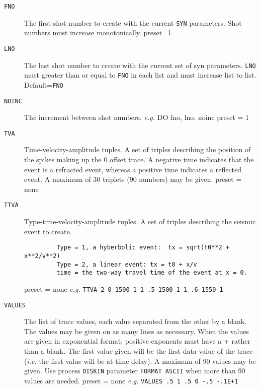 \begin{description}
    \item[\texttt{FNO}] The first \gls{shot} number to create with the current \texttt{SYN} parameters.
         Shot numbers must increase monotonically.
         \Gls{preset}=1

\item[\texttt{LNO}] The last \gls{shot} number to create with the current set of syn
         parameters.  \texttt{LNO} must greater than or equal to \texttt{FNO} in each list
         and must increase list to list.
         Default=\texttt{FNO}

\item[\texttt{NOINC}] The increment between \gls{shot} numbers.  \textit{e.g.} DO fno, lno, noinc
         \Gls{preset} = 1

\item[\texttt{TVA}] Time-velocity-amplitude tuples.  A set of triples describing
         the position of the spikes making up the 0 offset trace.  A
         negative time indicates that the event is a refracted event,
         whereas a positive time indicates a reflected event. A maximum
         of 30 triplets (90 numbers) may be given.
         \Gls{preset} = none

\item[\texttt{TTVA}] Type-time-velocity-amplitude tuples.  A set of triples
         describing the seismic event to create.
\begin{verbatim}
         Type = 1, a hyberbolic event:  tx = sqrt(t0**2 + x**2/v**2)
         Type = 2, a linear event: tx = t0 + x/v
         time = the two-way travel time of the event at x = 0.
\end{verbatim}
         \Gls{preset} = none
         \textit{e.g.} \texttt{TTVA 2 0 1500 1   1 .5 1500 1   1 .6 1550 1}

\item[\texttt{VALUES}] The list of trace values, each value separated from the other
         by a blank.  The values may be given on as many lines as
         necessary.  When the values are given in exponential format,
         positive exponents must have a + rather than a blank.  The
         first value given will be the first data value of the trace
         (\textit{i.e.} the first value will be at time delay).  A maximum of
         90 values may be given.  Use process \texttt{DISKIN} parameter
         \texttt{FORMAT ASCII} when more than 90 values are needed.
         \Gls{preset} = none        \textit{e.g.} \texttt{VALUES .5 1 .5 0 -.5 -.1E+1}


\end{description}
